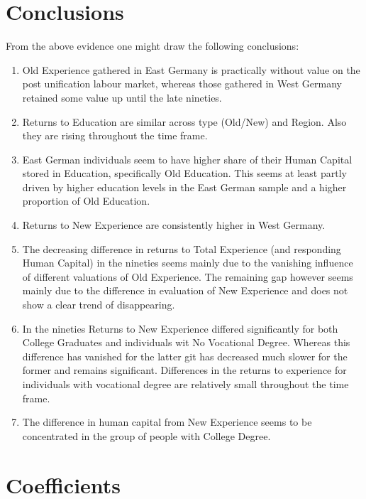 \documentclass{article}
\begin{document}
\section{Conclusions}
From the above evidence one might draw the following conclusions:
\begin{enumerate}
	\item Old Experience gathered in East Germany is practically without value on the post unification labour market, whereas those gathered in West Germany retained some value up until the late nineties.
	\item Returns to Education are similar across type (Old/New) and Region. Also they are rising throughout the time frame.
	\item East German individuals seem to have higher share of their Human Capital stored in Education, specifically Old Education. This seems at least partly driven by higher education levels in the East German sample and a higher proportion of Old Education.
	\item Returns to New Experience are consistently higher in West Germany. 
	\item The decreasing difference in returns to Total Experience (and responding Human Capital) in the nineties seems mainly due to the vanishing influence of different valuations of Old Experience. The remaining gap however seems mainly due to the difference in evaluation of New Experience and does not show a clear trend of disappearing.
	\item In the nineties Returns to New Experience differed significantly for both College Graduates and individuals wit No Vocational Degree. Whereas this difference has vanished for the latter git has decreased much slower for the former and remains significant. Differences in the returns to experience for individuals with vocational degree are relatively small throughout the time frame.
	\item The difference in human capital from New Experience seems to be concentrated in the group of people with College Degree.
\end{enumerate}
\FloatBarrier
\section{Coefficients}





\end{document}
